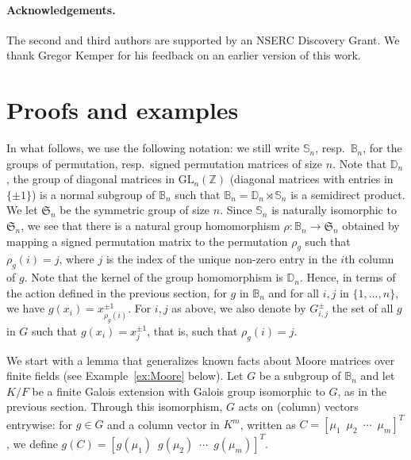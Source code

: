 \documentclass[12pt]{article}
\theoremstyle{plain}
\newcommand{\Z}{\ensuremath{\mathbb{Z}}}
\begin{document}
\paragraph{Acknowledgements.} The second and third authors are supported by an NSERC
Discovery Grant. We thank Gregor Kemper for his feedback on an earlier 
version of this work.



\section{Proofs and examples}


In what follows, we use the following notation: we still write
$\mathbb{S}_n$, resp.\ $\mathbb{B}_n$, for the groups of permutation,
resp.\ signed permutation matrices of size $n$. Note that $\mathbb{D}_n$, the group of  diagonal matrices 
in $\mathrm{GL}_n(\Z)$ (diagonal matrices with entries in $\{\pm 1\}$) is a normal subgroup of $\mathbb{B}_n$
such that $\mathbb{B}_n=\mathbb{D}_n\rtimes \mathbb{S}_n$ is a semidirect product.
We let $\mathfrak{S}_n$ be the symmetric group of size $n$.  Since $\mathbb{S}_n$ is naturally isomorphic to 
$\mathfrak{S}_n$, we see that there is a natural group homomorphism  
$\rho: \mathbb{B}_n \to \mathfrak{S}_n$ 
obtained by mapping a signed permutation matrix to the permutation
$\rho_g$ such that $\rho_g(i)=j$, where $j$ is the index of the
unique non-zero entry in the $i$th column of $g$.  Note that the kernel of the group homomorphism is $\mathbb{D}_n$. %
Hence, in terms of
the action defined in the previous section, for $g$ in $\mathbb{B}_n$
and for all $i,j$ in $\{1,\dots,n\}$, we have $g(x_i) =
x_{\rho_g(i)}^{\pm 1}$.  For $i,j$ as above, we also denote by
$G^{\pm}_{i,j}$ the set of all $g$ in $G$ such that $g(x_i)=x^{\pm 1}_j$, that is,
such that $\rho_g(i)=j$.

We start with a lemma that generalizes known facts about Moore
matrices over finite fields (see Example~\ref{ex:Moore} below). Let
$G$ be a subgroup of $\mathbb{B}_n$ and let $K/F$ be a finite Galois
extension with Galois group isomorphic to $G$, as in the previous
section. Through this isomorphism, $G$ acts on (column) vectors
entrywise: for $g \in G$ and a column vector in $K^m$, written as $C =
\left[\mu_{1} \,\,\, \mu_{2} \,\,\, \cdots \,\,\, \mu_{m}\right]^T$,
we define $g(C) = \left[g(\mu_{1}) \,\,\, g(\mu_{2}) \,\,\, \cdots
  \,\,\, g(\mu_{m})\right]^T$.
\end{document}
